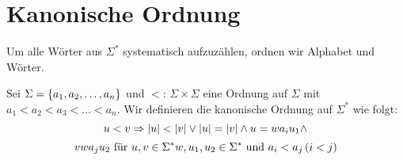 \section{Kanonische Ordnung}
Um alle Wörter aus $\Sigma^*$ systematisch aufzuzählen, ordnen wir Alphabet und Wörter.
\begin{definition}
Sei $\Sigma = \left\{a_1, a_2, \dots, a_n\right\}$ und $<$: $\Sigma \times \Sigma$ eine Ordnung auf $\Sigma$ mit $a_1 < a_2 < a_3 < \dots < a_n$. Wir definieren die kanonische Ordnung auf $\Sigma^*$ wie folgt:
\[u < v \Rightarrow \left|u\right| < \left|v\right| \vee \left|u\right| = \left|v\right| \wedge u = wa_i u_1 \wedge\]\[ v w a_j u_2 \text{ für } u, v \in \Sigma^* w, u_1, u_2 \in \Sigma^* \text{ und } a_i < a_j \left(i < j\right)\]
\end{definition}
